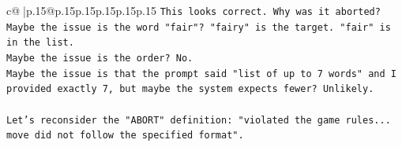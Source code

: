 \documentclass{article}
\begin{document}
{\begin{supertabular}{c@{$\;$}|p{.15\linewidth}@{}p{.15\linewidth}p{.15\linewidth}p{.15\linewidth}p{.15\linewidth}p{.15\linewidth}}
{{{\texttt{This looks correct. Why was it aborted?} \\
\texttt{Maybe the issue is the word "fair"? "fairy" is the target. "fair" is in the list.} \\
\texttt{Maybe the issue is the order? No.} \\
\texttt{Maybe the issue is that the prompt said "list of up to 7 words" and I provided exactly 7, but maybe the system expects fewer? Unlikely.} \\
\\ 
\texttt{Let's reconsider the "ABORT" definition: "violated the game rules... move did not follow the specified format".} \\
            }
        }
    }
     \\ \\

\end{supertabular}
}
\end{document}

